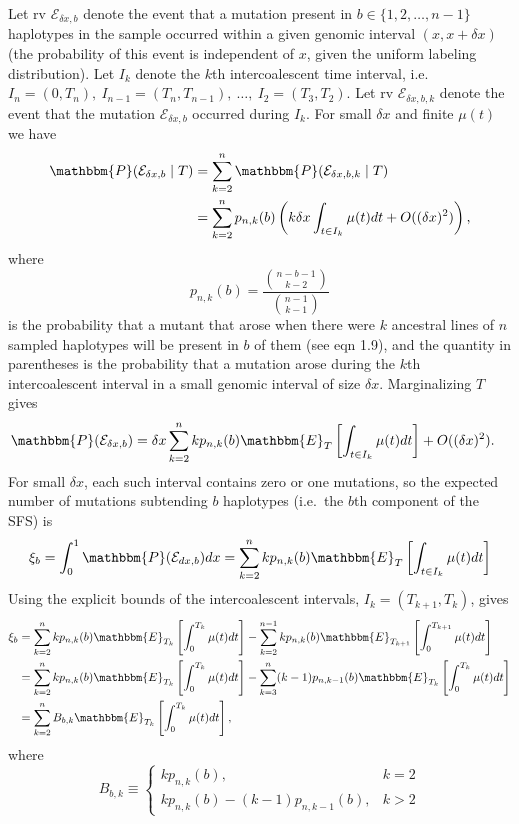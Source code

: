 Let rv $\mathcal{E}_{\delta x, b}$ denote the event that a mutation present in $b\in\{1, 2, \dots, n-1\}$ haplotypes in the sample occurred within a given genomic interval $(x,x+\delta x)$ (the probability of this event is independent of $x$, given the uniform labeling distribution).
Let $I_k$ denote the $k$th intercoalescent time interval, i.e.\ $I_n = (0, T_n),\ I_{n-1} = (T_n, T_{n-1}),\ \dots,\ I_2 = (T_3, T_2)$.
Let rv $\mathcal{E}_{\delta x, b, k}$ denote the event that the mutation $\mathcal{E}_{\delta x, b}$ occurred during $I_k$.
For small $\delta x$ and finite $\mu(t)$ we have
\begin{align*}
\mathbbm{P}(\mathcal{E}_{\delta x, b}\mid T) &= \sum_{k=2}^n \mathbbm{P}(\mathcal{E}_{\delta x, b, k}\mid T)\\
&= \sum_{k=2}^n p_{n,k}(b)\left(k\delta x\int_{t\in I_k}\mu(t)dt + O((\delta x)^2)\right),
\end{align*}
where
\begin{equation}
\label{eqn:p}
p_{n,k}(b) = \frac{\binom{n-b-1}{k-2}}{\binom{n-1}{k-1}}
\end{equation}
is the probability that a mutant that arose when there were $k$ ancestral lines of $n$ sampled haplotypes will be present in $b$ of them (see \cite{Griffiths1998-qf} eqn 1.9), and the quantity in parentheses is the probability that a mutation arose during the $k$th intercoalescent interval in a small genomic interval of size $\delta x$.
Marginalizing $T$ gives
\begin{align*}
\mathbbm{P}(\mathcal{E}_{\delta x, b}) &= \delta x\sum_{k=2}^n k p_{n,k}(b) \mathbbm{E}_T\left[\int_{t\in I_k}\mu(t)dt\right] + O((\delta x)^2).
\end{align*}
For small $\delta x$, each such interval contains zero or one mutations, so the expected number of mutations subtending $b$ haplotypes (i.e.\ the $b$th component of the SFS) is
\[
\xi_b = \int_0^1 \mathbbm{P}(\mathcal{E}_{dx, b})dx = \sum_{k=2}^n k p_{n,k}(b)\mathbbm{E}_T\left[\int_{t\in I_k}\mu(t)dt\right]\nonumber
\]
Using the explicit bounds of the intercoalescent intervals, $I_{k} = (T_{k+1}, T_k)$, gives
\begin{align}
\label{eqn:xi}
\xi_b &= \sum_{k=2}^n k p_{n,k}(b) \mathbbm{E}_{T_k}\left[\int_0^{T_k}\mu(t)dt\right] - \sum_{k=2}^{n-1} k p_{n,k}(b) \mathbbm{E}_{T_{k+1}}\left[\int_0^{T_{k+1}}\mu(t)dt\right]\nonumber\\
&= \sum_{k=2}^n k p_{n,k}(b) \mathbbm{E}_{T_k}\left[\int_0^{T_k}\mu(t)dt\right] - \sum_{k=3}^{n} (k-1) p_{n,k-1}(b) \mathbbm{E}_{T_{k}}\left[\int_0^{T_k}\mu(t)dt\right]\nonumber\\
&= \sum_{k=2}^n B_{b,k} \mathbbm{E}_{T_k}\left[\int_0^{T_k}\mu(t)dt\right],
\end{align}
where
\begin{equation}
\label{eqn:B}
B_{b,k}\equiv
\begin{cases}
k p_{n,k}(b),& k=2\\
k p_{n,k}(b) - (k-1) p_{n,k-1}(b),& k > 2
\end{cases}
\end{equation}

